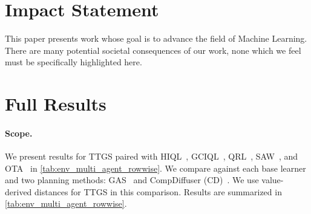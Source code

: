 \documentclass{article} %
\begin{document}
\section*{Impact Statement}
This paper presents work whose goal is to advance the field of Machine Learning. There are many potential societal consequences of our work, none which we feel must be specifically highlighted here.
\newpage





\newpage
\appendix
\onecolumn
\section{Full Results} \label{apdx:full_results}

\paragraph{Scope.}
We present results for TTGS paired with HIQL~\citep{park2024hiqlofflinegoalconditionedrl}, GCIQL~\citep{Kostrikov2022}, QRL~\citep{tongzhouw2023qrl}, SAW~\citep{zhou2025flattening}, and OTA~\citep{ota2025} in \autoref{tab:env_multi_agent_rowwise}. We compare against each base learner and two planning methods: GAS~\citep{gas_baek2025} and CompDiffuser (CD)~\citep{Luo2025CompDiffuser}. We use value-derived distances for TTGS in this comparison. Results are summarized in \autoref{tab:env_multi_agent_rowwise}. 
\end{document}

